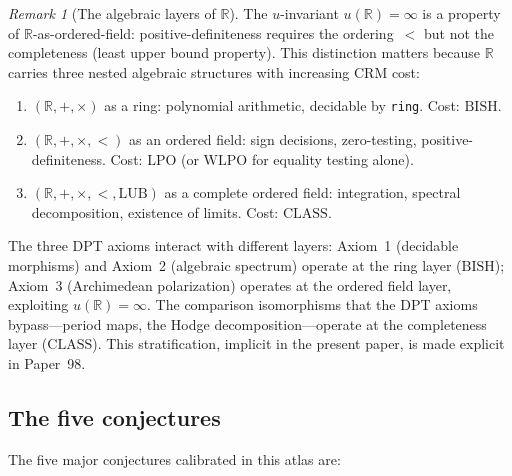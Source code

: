 \documentclass[11pt]{article}
\theoremstyle{definition}
\theoremstyle{remark}
\newtheorem{remark}[theorem]{Remark}
\newcommand{\R}{\mathbb{R}}
\newcommand{\WLPO}{\mathrm{WLPO}}
\newcommand{\LPO}{\mathrm{LPO}}
\newcommand{\BISH}{\mathrm{BISH}}
\newcommand{\CLASS}{\mathrm{CLASS}}
\begin{document}
\begin{remark}[The algebraic layers of $\R$]\label{rmk:R-layers}
The $u$-invariant $u(\R) = \infty$ is a property of $\R$-as-ordered-field: positive-definiteness requires the ordering~$<$ but not the completeness (least upper bound property). This distinction matters because $\R$ carries three nested algebraic structures with increasing CRM cost:
\begin{enumerate}[label=(\roman*)]
\item $(\R, +, \times)$ as a ring: polynomial arithmetic, decidable by \texttt{ring}. Cost: $\BISH$.
\item $(\R, +, \times, <)$ as an ordered field: sign decisions, zero-testing, positive-definiteness. Cost: $\LPO$ (or $\WLPO$ for equality testing alone).
\item $(\R, +, \times, <, \mathrm{LUB})$ as a complete ordered field: integration, spectral decomposition, existence of limits. Cost: $\CLASS$.
\end{enumerate}
The three DPT axioms interact with different layers: Axiom~1 (decidable morphisms) and Axiom~2 (algebraic spectrum) operate at the ring layer ($\BISH$); Axiom~3 (Archimedean polarization) operates at the ordered field layer, exploiting $u(\R) = \infty$. The comparison isomorphisms that the DPT axioms bypass---period maps, the Hodge decomposition---operate at the completeness layer ($\CLASS$). This stratification, implicit in the present paper, is made explicit in Paper~98.
\end{remark}

\subsection{The five conjectures}

The five major conjectures calibrated in this atlas are:
\end{document}
